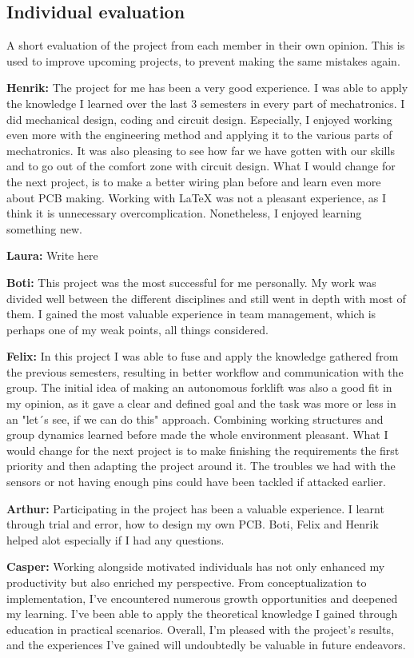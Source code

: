 \documentclass[../report.tex]{subfiles}
\begin{document}
\subsection{Individual evaluation}
A short evaluation of the project from each member in their own opinion. This is used to improve
upcoming projects, to prevent making the same mistakes again.

\textbf{Henrik:}
The project for me has been a very good experience. I was able to apply the knowledge
I learned over the last 3 semesters in every part of mechatronics. I did mechanical
design, coding and circuit design. Especially, I enjoyed working even more
with the engineering method and applying it to the various parts of mechatronics. 
It was also pleasing to see how far we have gotten with our skills and to go out of the comfort zone with circuit design. What I would change for the
next project, is to make a better wiring plan before and learn even more about PCB making.
Working with LaTeX was not a pleasant
experience, as I think it is unnecessary overcomplication. Nonetheless, I enjoyed learning something new.


\textbf{Laura:}
Write here

\textbf{Boti:}
This project was the most successful for me personally. My work was divided well between the different disciplines
and still went in depth with most of them. I gained the most valuable experience in team management, which is perhaps one of
my weak points, all things considered.

\textbf{Felix:}
In this project I was able to fuse and apply the knowledge gathered from the previous semesters, resulting in better 
workflow and communication with the group. The initial idea of making an autonomous forklift was also a good fit 
in my opinion, as it gave a clear and defined goal and the task was more or less in an "let´s see, if we can do this" 
approach. Combining working structures and group dynamics learned before made the whole environment pleasant.  What I would 
change for the next project is to make finishing the requirements the first priority and then adapting the project around it. 
The troubles we had with the sensors or not having enough pins could have been tackled if attacked earlier.



\textbf{Arthur:}
Participating in the project has been a valuable experience. I learnt through trial and error, how to design my own PCB. Boti, Felix and Henrik helped alot especially if I had any questions. 


\textbf{Casper:}
Working alongside motivated individuals has not only enhanced my productivity
but also enriched my perspective.  From conceptualization to implementation,
I've encountered numerous growth opportunities and deepened my learning. I've
been able to apply the theoretical knowledge I gained through education in
practical scenarios. Overall, I'm pleased with the project's results, and the
experiences I've gained will undoubtedly be valuable in future endeavors.
\end{document}

